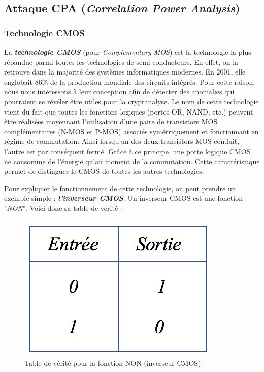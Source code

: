 \documentclass[oneside]{book}
\begin{document}
\newpage

\subsection{Attaque CPA (\textit{Correlation Power Analysis})}
\label{sec:CPA}

\subsubsection{Technologie CMOS}
\label{sec:CMOS}
La \textbf{\textit{technologie CMOS}} (pour \textit{Complementary MOS}) est la technologie la plus répandue parmi toutes les technologies de semi-conducteurs. En effet, on la retrouve dans la majorité des systèmes informatiques modernes. En 2001, elle englobait 86\% de la production mondiale des circuits intégrés. Pour cette raison, nous nous intéressons à leur conception afin de détecter des anomalies qui pourraient se révéler être utiles pour la cryptanalyse. Le nom de cette technologie vient du fait que toutes les fonctions logiques (portes OR, NAND, etc.) peuvent être réalisées moyennant l’utilisation d’une paire de transistors MOS complémentaires (N-MOS et P-MOS) associés symétriquement et fonctionnant en régime de commutation. Ainsi lorsqu'un des deux transistors MOS conduit, l’autre est par conséquent fermé. Grâce à ce principe, une porte logique CMOS ne consomme de l’énergie qu’au moment de la commutation. Cette caractéristique permet de distinguer le CMOS de toutes les autres technologies.

\hspace{-0.5 cm}Pour expliquer le fonctionnement de cette technologie, on peut prendre un exemple simple : \textbf{\textit{l'inverseur CMOS}}. Un inverseur CMOS est une fonction "\textit{NON}". Voici donc sa table de vérité :
\begin{figure}[htbp]
    \centering
    \includegraphics[scale=0.5]{image/verite}
    \caption{Table de vérité pour la fonction NON (inverseur CMOS).}
    \label{fig:verite} 
\end{figure}
\end{document}
